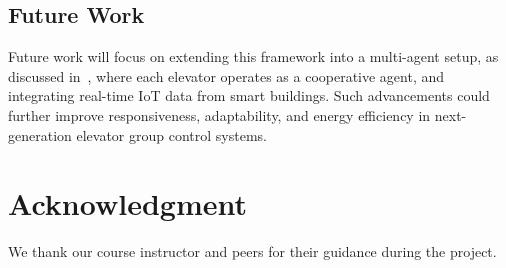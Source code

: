 \documentclass[conference]{IEEEtran}
\begin{document}
\subsection{Future Work}
Future work will focus on extending this framework into a multi-agent setup, as discussed in~\cite{sutton2018reinforcement}, where each elevator operates as a cooperative agent, and integrating real-time IoT data from smart buildings. Such advancements could further improve responsiveness, adaptability, and energy efficiency in next-generation elevator group control systems.

\section*{Acknowledgment}
We thank our course instructor and peers for their guidance during the project.



\end{document}
